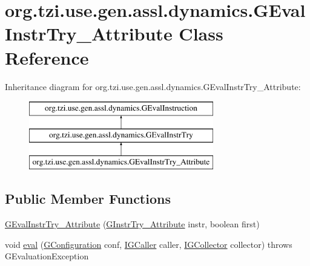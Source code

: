 \hypertarget{classorg_1_1tzi_1_1use_1_1gen_1_1assl_1_1dynamics_1_1_g_eval_instr_try___attribute}{\section{org.\-tzi.\-use.\-gen.\-assl.\-dynamics.\-G\-Eval\-Instr\-Try\-\_\-\-Attribute Class Reference}
\label{classorg_1_1tzi_1_1use_1_1gen_1_1assl_1_1dynamics_1_1_g_eval_instr_try___attribute}
}
Inheritance diagram for org.\-tzi.\-use.\-gen.\-assl.\-dynamics.\-G\-Eval\-Instr\-Try\-\_\-\-Attribute\-:\begin{figure}[H]
\begin{center}
\leavevmode
\includegraphics[height=3.000000cm]{classorg_1_1tzi_1_1use_1_1gen_1_1assl_1_1dynamics_1_1_g_eval_instr_try___attribute}
\end{center}
\end{figure}
\subsection*{Public Member Functions}
\begin{DoxyCompactItemize}
\item 
\hyperlink{classorg_1_1tzi_1_1use_1_1gen_1_1assl_1_1dynamics_1_1_g_eval_instr_try___attribute_a603033cd6b84d5b2af80e3d50ca2d803}{G\-Eval\-Instr\-Try\-\_\-\-Attribute} (\hyperlink{classorg_1_1tzi_1_1use_1_1gen_1_1assl_1_1statics_1_1_g_instr_try___attribute}{G\-Instr\-Try\-\_\-\-Attribute} instr, boolean first)
\item 
void \hyperlink{classorg_1_1tzi_1_1use_1_1gen_1_1assl_1_1dynamics_1_1_g_eval_instr_try___attribute_ac7f69d3ea3546ee087475913d44b09a2}{eval} (\hyperlink{classorg_1_1tzi_1_1use_1_1gen_1_1assl_1_1dynamics_1_1_g_configuration}{G\-Configuration} conf, \hyperlink{interfaceorg_1_1tzi_1_1use_1_1gen_1_1assl_1_1dynamics_1_1_i_g_caller}{I\-G\-Caller} caller, \hyperlink{interfaceorg_1_1tzi_1_1use_1_1gen_1_1assl_1_1dynamics_1_1_i_g_collector}{I\-G\-Collector} collector)  throws G\-Evaluation\-Exception 
\end{DoxyCompactItemize}
